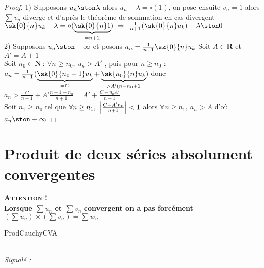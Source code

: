 		\begin{proof}
			{\small 1)} Supposons $u_n \ston \lambda$ alors $u_n - \lambda = \circ (1)$, on pose ensuite $v_n = 1$ alors $\sum v_n$ diverge 
			et d'après le théorème de sommation en cas divergent \\ $\sk{0}{n} u_k - \lambda = \circ ( \underbrace{\sk{0}{n} 1}_{=n+1} ) ~
			\Rightarrow ~\frac{1}{n+1} ( \sk{0}{n} u_k ) - \lambda \ston 0$ \\
			{\small 2)} Supposons $u_n \ston +\infty$ et posons $a_n = \frac{1}{n+1} \sk{0}{n} u_k$
			Soit $A\in\mathbf{R}$ et $A'=A+1$ \\ Soit $n_0 \in\mathbf{N} ~:~\forall n\geq n_0 ,~u_n >A'$ , puis pour $n\geq n_0$ :\\
			$a_n = \frac{1}{n+1} ( \underbrace{\sk{0}{n_0-1} u_k}_{=C} + \underbrace{\sk{n_0}{n} u_k}_{>A'(n-n_0+1} )$ 
			donc $a_n > \frac{C}{n+1} + A'\frac{n+1-n_0}{n+1} = A' + \frac{C-n_0A'}{n+1}$ \\ 
			Soit $n_1\geq n_0$ tel que $\forall n\geq n_1 ,~\left\vert \frac{C-A'n_0}{n+1} \right\vert <1$ alors $\forall n\geq n_1 ,~a_n > A$ d'où $a_n \ston +\infty$
		\end{proof}
	
	
\section{Produit de deux séries absolument convergentes}
		

		\textbf{\textsc{Attention !} \\Lorsque $\sum u_n$ et $\sum v_n$ convergent on a pas forcément 
		$\left(\sum u_n \right) \times \left(\sum v_n \right) = \sum w_n$}
		
		{ProdCauchyCVA}

		\vspace*{0.5cm}\\\textit{\small Signalé :} \\ 
		
